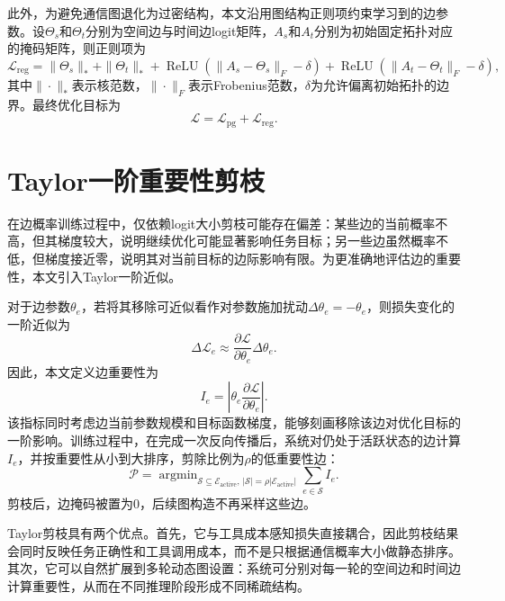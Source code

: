 此外，为避免通信图退化为过密结构，本文沿用图结构正则项约束学习到的边参数。设$\Theta_s$和$\Theta_t$分别为空间边与时间边logit矩阵，$A_s$和$A_t$分别为初始固定拓扑对应的掩码矩阵，则正则项为
\begin{equation}
  \mathcal{L}_{\mathrm{reg}}
  = \|\Theta_s\|_* + \|\Theta_t\|_*
  + \operatorname{ReLU}(\|A_s-\Theta_s\|_F-\delta)
  + \operatorname{ReLU}(\|A_t-\Theta_t\|_F-\delta),
  \label{eq:graph-regularization}
\end{equation}
其中$\|\cdot\|_*$表示核范数，$\|\cdot\|_F$表示Frobenius范数，$\delta$为允许偏离初始拓扑的边界。最终优化目标为
\begin{equation}
  \mathcal{L} = \mathcal{L}_{\mathrm{pg}}+\mathcal{L}_{\mathrm{reg}}.
  \label{eq:tool-aware-total-loss}
\end{equation}

\section{Taylor一阶重要性剪枝}

在边概率训练过程中，仅依赖logit大小剪枝可能存在偏差：某些边的当前概率不高，但其梯度较大，说明继续优化可能显著影响任务目标；另一些边虽然概率不低，但梯度接近零，说明其对当前目标的边际影响有限。为更准确地评估边的重要性，本文引入Taylor一阶近似。

对于边参数$\theta_e$，若将其移除可近似看作对参数施加扰动$\Delta\theta_e=-\theta_e$，则损失变化的一阶近似为
\begin{equation}
  \Delta\mathcal{L}_e
  \approx
  \frac{\partial \mathcal{L}}{\partial \theta_e}\Delta\theta_e.
  \label{eq:taylor-first-order}
\end{equation}
因此，本文定义边重要性为
\begin{equation}
  I_e = \left|\theta_e \frac{\partial \mathcal{L}}{\partial \theta_e}\right|.
  \label{eq:taylor-importance}
\end{equation}
该指标同时考虑边当前参数规模和目标函数梯度，能够刻画移除该边对优化目标的一阶影响。训练过程中，在完成一次反向传播后，系统对仍处于活跃状态的边计算$I_e$，并按重要性从小到大排序，剪除比例为$\rho$的低重要性边：
\begin{equation}
  \mathcal{P}
  =
  \operatorname{argmin}_{\mathcal{S}\subseteq \mathcal{E}_{\mathrm{active}},\,|\mathcal{S}|=\rho|\mathcal{E}_{\mathrm{active}}|}
  \sum_{e\in \mathcal{S}} I_e.
  \label{eq:taylor-prune-set}
\end{equation}
剪枝后，边掩码被置为0，后续图构造不再采样这些边。

Taylor剪枝具有两个优点。首先，它与工具成本感知损失直接耦合，因此剪枝结果会同时反映任务正确性和工具调用成本，而不是只根据通信概率大小做静态排序。其次，它可以自然扩展到多轮动态图设置：系统可分别对每一轮的空间边和时间边计算重要性，从而在不同推理阶段形成不同稀疏结构。

